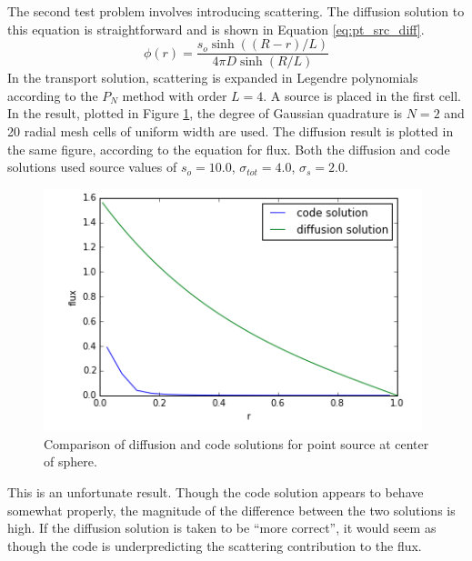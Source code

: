 \documentclass[11pt, oneside]{article}   	%
\begin{document}
The second test problem involves introducing scattering. The diffusion solution to this equation is straightforward and is shown in Equation \ref{eq:pt_src_diff}.
%
\begin{equation}\label{eq:pt_src_diff}
\phi(r) = \frac{s_o\sinh((R-r)/L)}{4\pi D \sinh(R/L)}
\end{equation}
%
In the transport solution, scattering is expanded in Legendre polynomials according to the $P_N$ method with order $L=4$. A source is placed in the first cell. In the result, plotted in Figure \ref{fig:origin_pt_source}, the degree of Gaussian quadrature is $N=2$ and 20 radial mesh cells of uniform width are used. The diffusion result is plotted in the same figure, according to the equation for flux. Both the diffusion and code solutions used source values of $s_o = 10.0$, $\sigma_{tot} = 4.0$, $\sigma_s = 2.0$.
%
\begin{figure}
\centering
\includegraphics[width=11cm]{origin_pt_source_soln}
\caption{Comparison of diffusion and code solutions for point source at center of sphere.}
\label{fig:origin_pt_source}
\end{figure}
%
This is an unfortunate result. Though the code solution appears to behave somewhat properly, the magnitude of the difference between the two solutions is high. If the diffusion solution is taken to be ``more correct'', it would seem as though the code is underpredicting the scattering contribution to the flux.
\end{document}
